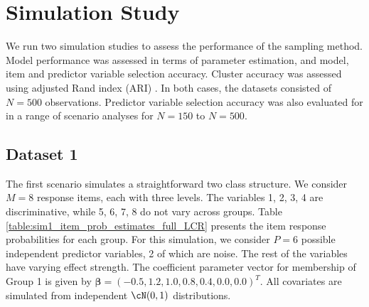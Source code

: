 \documentclass[11pt]{article}
\def\bsbet{\boldsymbol{\beta}}
\theoremstyle{plain}
\theoremstyle{definition}
\begin{document}
\section{Simulation Study}\label{sec:sim_study}
We run two simulation studies to assess the performance of the sampling method. Model performance was assessed in terms of parameter estimation, and model, item and predictor variable selection accuracy. Cluster accuracy was assessed using adjusted Rand index (ARI) \citep{hubert_comparing_1985}. In both cases, the datasets consisted of $N = 500$ observations. Predictor variable selection accuracy was also evaluated for in a range of scenario analyses for $N = 150$ to $N = 500$.
\subsection{Dataset 1}\label{subsec:sim_study1}
The first scenario simulates a straightforward two class structure. We consider $M = 8$ response items, each with three levels. The variables 1, 2, 3, 4 are discriminative, while 5, 6, 7, 8 do not vary across groups.  Table \ref{table:sim1_item_prob_estimates_full_LCR} presents the item response probabilities for each group.
For this simulation, we consider $P = 6$ possible independent predictor variables, 2 of which are noise. The rest of the variables have varying effect strength. The coefficient parameter vector for membership of Group 1 is given by $\bsbet = (-0.5, 1.2, 1.0, 0.8, 0.4, 0.0, 0.0)^T$. All covariates are simulated from independent $\cN(0,1)$ distributions.
\end{document}

